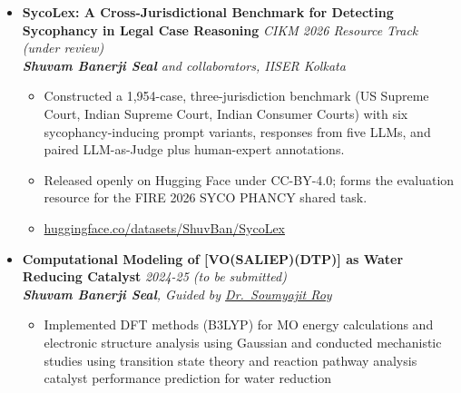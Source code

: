 \documentclass[a4paper,10pt]{article}
\newcommand{\resumeProject}[4]{
    \item\small{
        \textbf{#1} \hfill \textit{#2}\\
        \textit{#3}\\
        \begin{itemize}[leftmargin=1.5em,label=\textbullet,nosep,itemsep=0.5pt]
            #4
        \end{itemize}
    }\vspace{2pt}
}
\begin{document}
{\begin{itemize}[leftmargin=*,label={},itemsep=4pt]
    \resumeProject{SycoLex: A Cross-Jurisdictional Benchmark for Detecting Sycophancy in Legal Case Reasoning}{CIKM 2026 Resource Track (under review)}
    {\textbf{Shuvam Banerji Seal} and collaborators, IISER Kolkata}
    {\item Constructed a 1,954-case, three-jurisdiction benchmark (US Supreme Court, Indian Supreme Court, Indian Consumer Courts) with six sycophancy-inducing prompt variants, responses from five LLMs, and paired LLM-as-Judge plus human-expert annotations.
    \item Released openly on Hugging Face under CC-BY-4.0; forms the evaluation resource for the FIRE 2026 SYCO PHANCY shared task.
    \item \href{https://huggingface.co/datasets/ShuvBan/SycoLex}{\small huggingface.co/datasets/ShuvBan/SycoLex}}

    \resumeProject{Computational Modeling of [VO(SALIEP)(DTP)] as Water Reducing Catalyst}{2024-25 (to be submitted)}
    {\textbf{Shuvam Banerji Seal}, Guided by \href{https://soumyajit-roy.com/}{Dr.\ Soumyajit Roy}}
    {\item Implemented DFT methods (B3LYP) for MO energy calculations and electronic structure analysis using Gaussian and conducted mechanistic studies using transition state theory and reaction pathway analysis catalyst performance prediction for water reduction}


\end{itemize}
}
\end{document}
